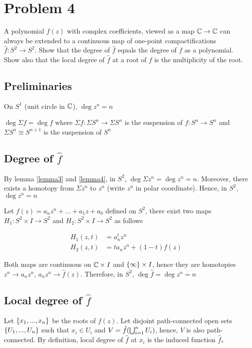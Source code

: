 \documentclass{article}
\begin{document}
\section{Problem 4}
A polynomial $f(z)$ with complex coefficients, viewed as a map $\mathbb{C} \to \mathbb{C}$ can always be extended to a continuous map of one-point compactifications $\hat{f}: S^2 \to S^2$. Show that the degree of $\hat{f}$ equals the degree of $f$ as a polynomial. Show also that the local degree of $\hat{f}$ at a root of $f$ is the multiplicity of the root.

\subsection{Preliminaries}

\begin{lemma}
    \label{lemma3}
    On $S^1$ (unit circle in $\mathbb{C}$), $\deg z^n = n$
\end{lemma}

\begin{lemma}
    \label{lemma4}
    $\deg \Sigma f = \deg f$ where $\Sigma f: \Sigma S^n \to \Sigma S^n$ is the suspension of $f: S^n \to S^n$ and $\Sigma S^n \cong S^{n+1}$ is the suspension of $S^n$
\end{lemma}


\subsection{Degree of $\hat{f}$}

By lemma \ref{lemma3} and \ref{lemma4}, in $S^2$, $\deg \Sigma z^n = \deg z^n = n$. Moreover, there exists a homotopy from $\Sigma z^n$ to $z^n$ (write $z^n$ in polar coordinate). Hence, in $S^2$, $\deg z^n = n$

Let $f(z) = a_n z^n + ... + a_1 z + a_0$ defined on $S^2$, there exist two maps $H_1: S^2 \times I \to S^2$ and $H_2: S^2 \times I \to S^2$ as follows

\begin{align*}
    H_1(z, t) &= a_n^t z^n\\
    H_2(z, t) &= ta_n z^n + (1-t)f(z)
\end{align*}

Both maps are continuous on $\mathbb{C} \times I$ and $\{\infty\} \times I$, hence they are homotopies $z^n \to a_n z^n$, $a_n z^n \to \hat{f}(z)$. Therefore, in $S^2$, $\deg \hat{f} = \deg z^n = n$

\subsection{Local degree of $\hat{f}$}
Let $\{x_1, ..., x_n\}$ be the roots of $f(z)$. Let disjoint path-connected open sets $\{U_1, ..., U_n\}$ such that $x_i \in U_i$ and $V = \hat{f}\tuple*{\bigcup_{i=1}^n U_i}$, hence, $V$ is also path-connected. By definition, local degree of $\hat{f}$ at $x_i$ is the induced function $\hat{f}_*$
\end{document}
